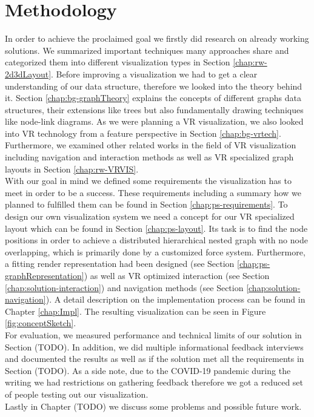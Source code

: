 \section{Methodology}
In order to achieve the proclaimed goal we firstly did research on already working solutions. We summarized important techniques many approaches share and categorized them into different visualization types in Section \ref{chap:rw-2d3dLayout}. 
Before improving a visualization we had to get a clear understanding of our data structure, therefore we looked into the theory behind it. Section \ref{chap:bg-graphTheory} explains the concepts of different graphs data structures, their extensions like trees but also fundamentally drawing techniques like node-link diagrams.
As we were planning a VR visualization, we also looked into VR technology from a feature perspective in Section \ref{chap:bg-vrtech}. Furthermore, we examined other related works in the field of VR visualization including navigation and interaction methods as well as VR specialized graph layouts in Section \ref{chap:rw-VRVIS}.\\
With our goal in mind we defined some requirements the visualization has to meet in order to be a success. These requirements including a summary how we planned to fulfilled them can be found in Section \ref{chap:ps-requirements}. 
To design our own visualization system we need a concept for our VR specialized layout which can be found in Section \ref{chap:ps-layout}. 
Its task is to find the node positions in order to achieve a distributed hierarchical nested graph with no node overlapping, which is primarily done by a customized force system.
Furthermore, a fitting render representation had been designed (see Section \ref{chap:ps-graphRepresentation}) as well as VR optimized interaction (see Section \ref{chap:solution-interaction}) and navigation methods (see Section \ref{chap:solution-navigation}). 
A detail description on the implementation process can be found in Chapter \ref{chap:Impl}. The resulting visualization can be seen in Figure \ref{fig:conceptSketch}.\\
For evaluation, we measured performance and technical limits of our solution in Section (TODO). In addition, we did multiple informational feedback interviews and documented the results as well as if the solution met all the requirements in Section (TODO). As a side note, due to the COVID-19 pandemic during the writing we had restrictions on gathering feedback therefore we got a reduced set of people testing out our visualization.\\
Lastly in Chapter (TODO) we discuss some problems and possible future work.

